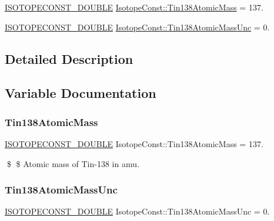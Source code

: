 \begin{DoxyCompactItemize}
\item 
\mbox{\hyperlink{group___isotope_const-_macros_ga8f45a7272ce02c0b4c65c44636ed719a}{I\+S\+O\+T\+O\+P\+E\+C\+O\+N\+S\+T\+\_\+\+D\+O\+U\+B\+LE}} \mbox{\hyperlink{group___isotope_const-_tin-_sn138_ga1f81b0b7146ac4f087780154f7320a8c}{Isotope\+Const\+::\+Tin138\+Atomic\+Mass}} = 137.
\item 
\mbox{\hyperlink{group___isotope_const-_macros_ga8f45a7272ce02c0b4c65c44636ed719a}{I\+S\+O\+T\+O\+P\+E\+C\+O\+N\+S\+T\+\_\+\+D\+O\+U\+B\+LE}} \mbox{\hyperlink{group___isotope_const-_tin-_sn138_gab5b8da114d6f681a5338c03e5f0b7b62}{Isotope\+Const\+::\+Tin138\+Atomic\+Mass\+Unc}} = 0.
\end{DoxyCompactItemize}


\subsection{Detailed Description}


\subsection{Variable Documentation}
\mbox{\label{group___isotope_const-_tin-_sn138_ga1f81b0b7146ac4f087780154f7320a8c}} 
\subsubsection{\texorpdfstring{Tin138\+Atomic\+Mass}{Tin138AtomicMass}}
{\footnotesize\ttfamily \mbox{\hyperlink{group___isotope_const-_macros_ga8f45a7272ce02c0b4c65c44636ed719a}{I\+S\+O\+T\+O\+P\+E\+C\+O\+N\+S\+T\+\_\+\+D\+O\+U\+B\+LE}} Isotope\+Const\+::\+Tin138\+Atomic\+Mass = 137.}

\$ \$ Atomic mass of Tin-\/138 in amu. \mbox{\label{group___isotope_const-_tin-_sn138_gab5b8da114d6f681a5338c03e5f0b7b62}} 
\subsubsection{\texorpdfstring{Tin138\+Atomic\+Mass\+Unc}{Tin138AtomicMassUnc}}
{\footnotesize\ttfamily \mbox{\hyperlink{group___isotope_const-_macros_ga8f45a7272ce02c0b4c65c44636ed719a}{I\+S\+O\+T\+O\+P\+E\+C\+O\+N\+S\+T\+\_\+\+D\+O\+U\+B\+LE}} Isotope\+Const\+::\+Tin138\+Atomic\+Mass\+Unc = 0.}

